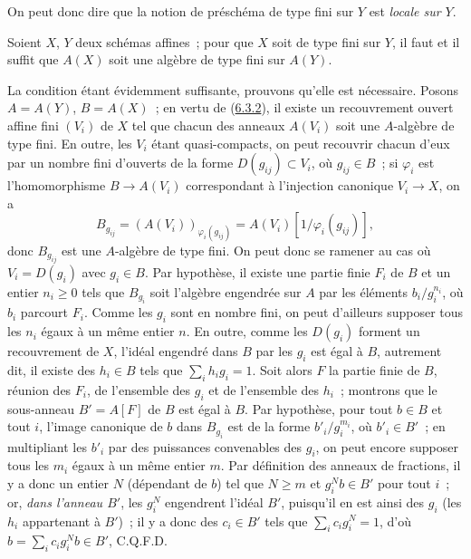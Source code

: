 On peut donc dire que la notion de préschéma de type fini sur $Y$ est
\emph{locale sur $Y$}.

\begin{proposition}[6.3.3]
\label{I.6.3.3-fr}
Soient $X$, $Y$ deux schémas affines~; pour que $X$ soit de type fini sur
$Y$, il faut et il suffit que $A(X)$ soit une algèbre de type fini sur
$A(Y)$.
\end{proposition}

La condition étant évidemment suffisante, prouvons qu'elle est nécessaire.
Posons $A=A(Y)$, $B=A(X)$~; en vertu de
(\hyperref[I.6.3.2-fr]{6.3.2}), il existe un recouvrement ouvert affine fini
$(V_i)$ de $X$ tel que chacun des anneaux $A(V_i)$ soit une $A$-algèbre de
type fini. En outre, les $V_i$ étant quasi-compacts, on peut recouvrir chacun
d'eux par un nombre fini d'ouverts de la forme $D(g_{ij})\subset V_i$, où
$g_{ij}\in B$~; si $\varphi_i$ est l'homomorphisme $B\to A(V_i)$ correspondant
à l'injection canonique $V_i\to X$, on a
\[
  B_{g_{ij}}=(A(V_i))_{\varphi_i(g_{ij})}
  =A(V_i)[1/\varphi_i(g_{ij})],
\]
donc $B_{g_{ij}}$ est une $A$-algèbre de type fini. On peut donc se ramener
au cas où $V_i=D(g_i)$ avec $g_i\in B$. Par hypothèse, il existe une partie
finie $F_i$ de $B$ et un entier $n_i\geq 0$ tels que $B_{g_i}$ soit l'algèbre
engendrée sur $A$ par les éléments $b_i/g_i^{n_i}$, où $b_i$ parcourt $F_i$.
Comme les $g_i$ sont en nombre fini, on peut d'ailleurs supposer tous les
$n_i$ égaux à un même entier $n$. En outre, comme les $D(g_i)$ forment un
recouvrement de $X$, l'idéal engendré dans $B$ par les $g_i$ est égal à $B$,
autrement dit, il existe des $h_i\in B$ tels que
$\sum_i h_i g_i=1$. Soit alors $F$ la partie finie de $B$, réunion des $F_i$,
de l'ensemble des $g_i$ et de l'ensemble des $h_i$~; montrons que le
sous-anneau $B'=A[F]$ de $B$ est égal à $B$. Par hypothèse, pour tout $b\in B$
et tout $i$, l'image canonique de $b$ dans $B_{g_i}$ est de la forme
$b'_i/g_i^{m_i}$, où $b'_i\in B'$~; en multipliant les $b'_i$ par des
puissances convenables des $g_i$, on peut encore supposer tous les $m_i$
égaux à un même entier $m$. Par définition des anneaux de fractions, il y a
donc un entier $N$ (dépendant de $b$) tel que $N\geq m$ et $g_i^N b\in B'$ pour
tout $i$~; or, \emph{dans l'anneau $B'$}, les $g_i^N$ engendrent l'idéal $B'$,
puisqu'il en est ainsi des $g_i$ (les $h_i$ appartenant à $B'$)~; il y a donc
des $c_i\in B'$ tels que $\sum_i c_i g_i^N=1$, d'où
$b=\sum_i c_i g_i^N b\in B'$, C.Q.F.D.


